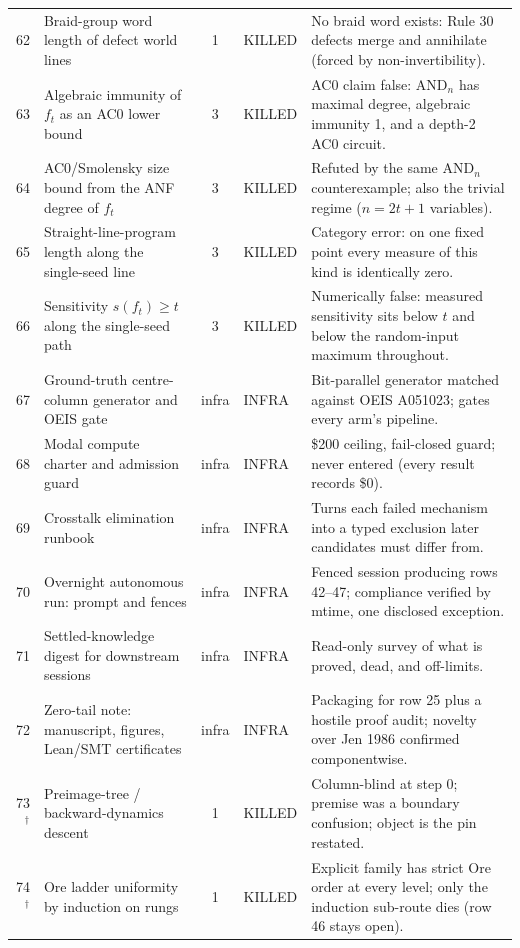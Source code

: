 \documentclass[11pt]{article}
\theoremstyle{definition}
\begin{document}
{\begin{longtable}{@{}r p{4.0cm} c p{1.7cm} p{6.1cm}@{}}
62 & Braid-group word length of defect world lines & 1 & KILLED & No braid word exists: Rule 30 defects merge and annihilate (forced by non-invertibility). \\
63 & Algebraic immunity of $f_t$ as an AC0 lower bound & 3 & KILLED & AC0 claim false: $\mathrm{AND}_n$ has maximal degree, algebraic immunity 1, and a depth-2 AC0 circuit. \\
64 & AC0/Smolensky size bound from the ANF degree of $f_t$ & 3 & KILLED & Refuted by the same $\mathrm{AND}_n$ counterexample; also the trivial regime ($n=2t+1$ variables). \\
65 & Straight-line-program length along the single-seed line & 3 & KILLED & Category error: on one fixed point every measure of this kind is identically zero. \\
66 & Sensitivity $s(f_t)\ge t$ along the single-seed path & 3 & KILLED & Numerically false: measured sensitivity sits below $t$ and below the random-input maximum throughout. \\
67 & Ground-truth centre-column generator and OEIS gate & infra & INFRA & Bit-parallel generator matched against OEIS A051023; gates every arm's pipeline. \\
68 & Modal compute charter and admission guard & infra & INFRA & \$200 ceiling, fail-closed guard; never entered (every result records \$0). \\
69 & Crosstalk elimination runbook & infra & INFRA & Turns each failed mechanism into a typed exclusion later candidates must differ from. \\
70 & Overnight autonomous run: prompt and fences & infra & INFRA & Fenced session producing rows 42--47; compliance verified by mtime, one disclosed exception. \\
71 & Settled-knowledge digest for downstream sessions & infra & INFRA & Read-only survey of what is proved, dead, and off-limits. \\
72 & Zero-tail note: manuscript, figures, Lean/SMT certificates & infra & INFRA & Packaging for row 25 plus a hostile proof audit; novelty over Jen 1986 confirmed componentwise. \\
73$^\dagger$ & Preimage-tree / backward-dynamics descent & 1 & KILLED & Column-blind at step 0; premise was a boundary confusion; object is the pin restated. \\
74$^\dagger$ & Ore ladder uniformity by induction on rungs & 1 & KILLED & Explicit family has strict Ore order at every level; only the induction sub-route dies (row 46 stays open). \\

\end{longtable}}
\end{document}
